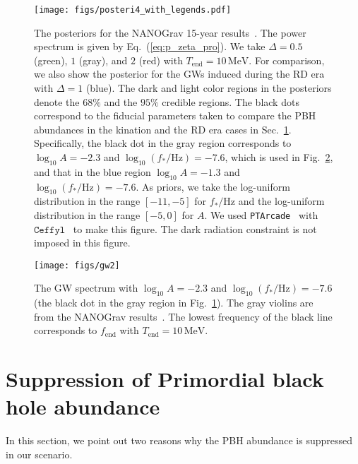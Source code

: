 \documentclass[superscriptaddress, aps, preprintnumbers,
amsmath, amssymb, sort&compress, nofootinbib, 10pt, paper, floatfix]{revtex4-2}
\newcommand{\MeV}{\text{MeV}}
\begin{document}
\begin{figure}
        \centering \texttt{[image: figs/posteri4\_with\_legends.pdf]}
        \caption{ The posteriors for the NANOGrav 15-year results~\cite{NANOGrav:2023gor,NANOGrav:2023hvm}.
        The power spectrum is given by Eq.~(\ref{eq:p_zeta_pro}).
        We take $\Delta = 0.5$ (green), $1$ (gray), and $2$ (red) with $T_\text{end} = 10\,\MeV$.
        For comparison, we also show the posterior for the GWs induced during the RD era with $\Delta = 1$ (blue).
         The dark and light color regions in the posteriors denote the $68\%$ and the $95\%$ credible regions. 
         The black dots correspond to the fiducial parameters taken to compare the PBH abundances in the kination and the RD era cases in Sec.~\ref{sec:PBH}.
         Specifically, the black dot in the gray region corresponds to $\log_{10} A = -2.3$ and $\log_{10}(f_*/\text{Hz}) = -7.6$, which is used in Fig.~\ref{fig:gw}, and that in the blue region $\log_{10} A = -1.3$ and $\log_{10}(f_*/\text{Hz}) = -7.6$.
         As priors, we take the log-uniform distribution in the range $[-11,-5]$ for $f_*/\text{Hz}$ and the log-uniform distribution in the range $[-5,0]$ for $A$.
         We used \texttt{PTArcade}~\cite{andrea_mitridate_2023, Mitridate:2023oar} with $\mathtt{Ceffyl}$~\cite{lamb2023need} to make this figure.  The dark radiation constraint is not imposed in this figure.
        }
        \label{fig:posteri}
\end{figure}

 
\begin{figure}
        \centering \texttt{[image: figs/gw2]}
        \caption{ 
        The GW spectrum with $\log_{10} A = -2.3$ and $\log_{10}(f_*/\text{Hz})= -7.6$ (the black dot in the gray region in Fig.~\ref{fig:posteri}).
        The gray violins are from the NANOGrav results~\cite{NANOGrav:2023hvm}.
        The lowest frequency of the black line corresponds to $f_\text{end}$ with $T_\text{end} = 10\,\MeV$.
        }
        \label{fig:gw}
\end{figure}


\section{Suppression of Primordial black hole abundance} \label{sec:PBH}

In this section, we point out two reasons why the PBH abundance is suppressed in our scenario. 
\end{document}
